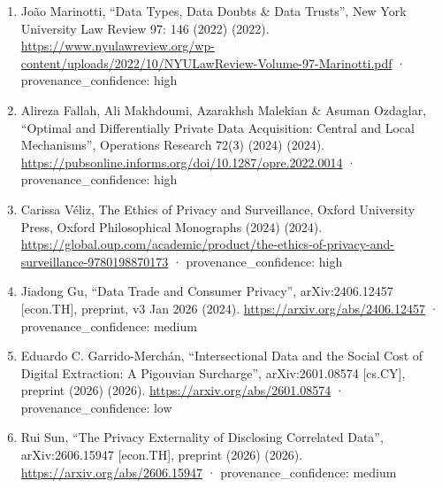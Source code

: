 \documentclass[
  11pt,
]{article}
\begin{document}
\begin{enumerate}
  Ignacio N. Cofone, ``Beyond Data Ownership'', Cardozo Law Review 43(2)
  (2022) (2022). \url{https://larc.cardozo.yu.edu/clr/vol43/iss2/4/} ·
  provenance\_confidence: high
\item
  João Marinotti, ``Data Types, Data Doubts \& Data Trusts'', New York
  University Law Review 97: 146 (2022) (2022).
  \url{https://www.nyulawreview.org/wp-content/uploads/2022/10/NYULawReview-Volume-97-Marinotti.pdf}
  · provenance\_confidence: high
\item
  Alireza Fallah, Ali Makhdoumi, Azarakhsh Malekian \& Asuman Ozdaglar,
  ``Optimal and Differentially Private Data Acquisition: Central and
  Local Mechanisms'', Operations Research 72(3) (2024) (2024).
  \url{https://pubsonline.informs.org/doi/10.1287/opre.2022.0014} ·
  provenance\_confidence: high
\item
  Carissa Véliz, The Ethics of Privacy and Surveillance, Oxford
  University Press, Oxford Philosophical Monographs (2024) (2024).
  \url{https://global.oup.com/academic/product/the-ethics-of-privacy-and-surveillance-9780198870173}
  · provenance\_confidence: high
\item
  Jiadong Gu, ``Data Trade and Consumer Privacy'', arXiv:2406.12457
  {[}econ.TH{]}, preprint, v3 Jan 2026 (2024).
  \url{https://arxiv.org/abs/2406.12457} · provenance\_confidence:
  medium
\item
  Eduardo C. Garrido-Merchán, ``Intersectional Data and the Social Cost
  of Digital Extraction: A Pigouvian Surcharge'', arXiv:2601.08574
  {[}cs.CY{]}, preprint (2026) (2026).
  \url{https://arxiv.org/abs/2601.08574} · provenance\_confidence: low
\item
  Rui Sun, ``The Privacy Externality of Disclosing Correlated Data'',
  arXiv:2606.15947 {[}econ.TH{]}, preprint (2026) (2026).
  \url{https://arxiv.org/abs/2606.15947} · provenance\_confidence:
  medium
\end{enumerate}
\end{document}
